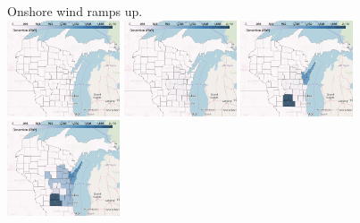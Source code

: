 \documentclass[xcolor=dvipsnames]{beamer}
\begin{document}
\begin{frame}
  Onshore wind ramps up. \\
  \includegraphics[width=0.25\textwidth]{includes/no_leakage_no_shutdowns_wind_r0.png}
  \includegraphics[width=0.25\textwidth]{includes/no_leakage_no_shutdowns_wind_r2.png}
  \includegraphics[width=0.25\textwidth]{includes/no_leakage_no_shutdowns_wind_r3.png}
  \includegraphics[width=0.25\textwidth]{includes/no_leakage_no_shutdowns_wind_r4.png}
\end{frame}
\end{document}
